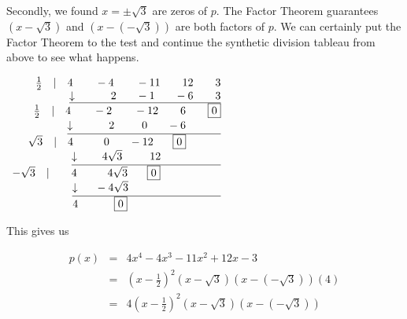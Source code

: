 \documentclass{ximera}
\begin{document}
 

Secondly, we found $x = \pm \sqrt{3}$ are zeros of $p$.  The Factor Theorem guarantees $\left(x-\sqrt{3}\right)$ and $\left(x - \left(-\sqrt{3}\right)\right)$ are both factors of $p$.  We can certainly put the Factor Theorem to the test and continue the synthetic division tableau from above to see what happens.

\begin{center}
$
\begin{array}{r}
 \frac{1}{2} \quad |\quad 4 \quad\quad -4 \quad\quad -11 \quad\quad 12 \quad\quad 3\\
 \underline{\downarrow \phantom{11}\quad\quad  2 \quad\phantom{1.} -1\quad\phantom{1.} -6 \quad\quad 3}\\
 \frac{1}{2} \quad |\quad 4 \quad\quad -2 \quad\quad -12 \quad\quad 6 \quad\quad \fbox{0}\\
 \underline{\downarrow \phantom{11}\quad\quad  2 \quad\phantom{111} 0\quad\phantom{1.} -6 \phantom{\quad\quad \fbox{0}}}\\
\sqrt{3} \quad |\quad 4 \phantom{1.}\quad\quad 0 \phantom{1.}\quad -12 \phantom{1.}\quad \fbox{0} \phantom{\quad\quad \fbox{0}}\\
 \underline{\downarrow \phantom{11}\quad  4\sqrt{3} \quad\phantom{111} 12\quad \phantom{-6 \quad\quad \fbox{0}}}\\
-\sqrt{3} \quad |\quad\quad 4 \quad\quad\phantom{1.} 4\sqrt{3} \phantom{1.}\quad \fbox{0}  \phantom{1.} \phantom{-12 \phantom{1.}  \quad \fbox{0}}\\
 \underline{\downarrow \quad\phantom{.}  -4\sqrt{3} \phantom{111} \phantom{12\quad -6 \quad\quad \fbox{0}}}\\
 4 \phantom{11.}\quad\quad \fbox{0}  \phantom{1.}\quad \phantom{-12 \phantom{1.}\quad  \quad\quad \fbox{0}}
\end{array}
$    
\end{center}

This gives us

 \[\begin{array}{rcl} 
 
 p(x) & = &  4x^4-4x^3-11x^2+12x-3 \\
        & = & \left(x-\frac{1}{2}\right)^2 \left(x-\sqrt{3}\right)\left(x - \left(-\sqrt{3}\right)\right) (4) \\
        & = &  4\left(x-\frac{1}{2}\right)^2 \left(x-\sqrt{3}\right)\left(x - \left(-\sqrt{3}\right)\right) \\ \end{array} \]
\end{document}
